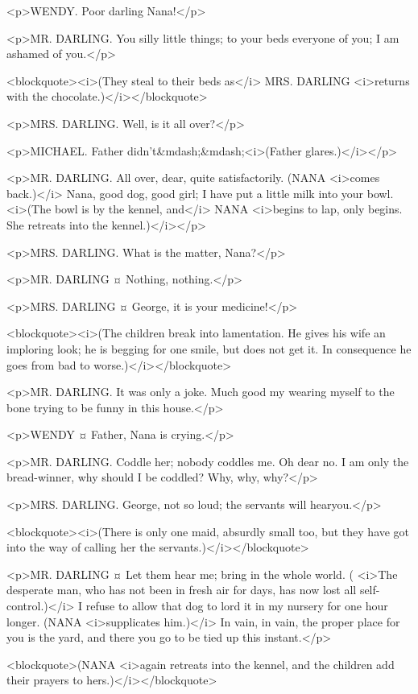 <p>WENDY. Poor darling Nana!</p>

<p>MR. DARLING. You silly little things; to your beds everyone of you; I am ashamed of you.</p>

<blockquote><i>(They steal to their beds as</i> MRS. DARLING <i>returns with the chocolate.)</i></blockquote>

<p>MRS. DARLING. Well, is it all over?</p>

<p>MICHAEL. Father didn't&mdash;&mdash;<i>(Father glares.)</i></p>

<p>MR. DARLING. All over, dear, quite satisfactorily. (NANA <i>comes back.)</i> Nana, good dog, good girl; I have put a little milk into your bowl. <i>(The bowl is by the kennel, and</i> NANA <i>begins to lap, only begins. She retreats into the kennel.)</i></p>

<p>MRS. DARLING. What is the matter, Nana?</p>

<p>MR. DARLING ¤
Nothing, nothing.</p>

<p>MRS. DARLING ¤
George, it is your medicine!</p>

<blockquote><i>(The children break into lamentation. He gives his wife an imploring look; he is begging for one smile, but does not get it. In consequence he goes from bad to worse.)</i></blockquote>

<p>MR. DARLING. It was only a joke. Much good my wearing myself to the bone trying to be funny in this house.</p>

<p>WENDY ¤
Father, Nana is crying.</p>

<p>MR. DARLING. Coddle her; nobody coddles me. Oh dear no. I am only the bread-winner, why should I be coddled? Why, why, why?</p>

<p>MRS. DARLING. George, not so loud; the servants will hearyou.</p>

<blockquote><i>(There is only one maid, absurdly small too, but they have got into the way of calling her the servants.)</i></blockquote>

<p>MR. DARLING ¤
Let them hear me; bring in the whole world. ( <i>The desperate man, who has not been in fresh air for days, has now lost all self-control.)</i> I refuse to allow that dog to lord it in my nursery for one hour longer. (NANA <i>supplicates him.)</i> In vain, in vain, the proper place for you is the yard, and there you go to be tied up this instant.</p>

<blockquote>(NANA <i>again retreats into the kennel, and the children add their prayers to hers.)</i></blockquote>

